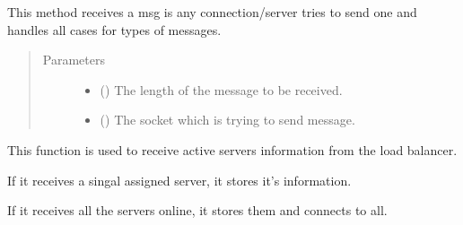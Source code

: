 \documentclass[letterpaper,10pt,english]{sphinxmanual}
\begin{document}
\begin{fulllineitems}
\begin{fulllineitems}
\begin{quote}
\begin{description}
\begin{itemize}
\end{itemize}

\end{description}\end{quote}

\end{fulllineitems}


\begin{fulllineitems}
\label{\detokenize{clientHelper:clientHelper.Client.recvMessage}}
This method receives a msg is any connection/server tries to send one and handles all cases for types of messages.
\begin{quote}\begin{description}
\item[{Parameters}] \leavevmode\begin{itemize}
\item {} 
 () \textendash{} The length of the message to be received.

\item {} 
 () \textendash{} The socket which is trying to send message.

\end{itemize}

\end{description}\end{quote}

\end{fulllineitems}


\begin{fulllineitems}
\label{\detokenize{clientHelper:clientHelper.Client.recvServers}}
This function is used to receive active servers information from the load balancer.

If it receives a singal assigned server, it stores it’s information.

If it receives all the servers online, it stores them and connects to all.


\end{fulllineitems}
\end{fulllineitems}
\end{document}
